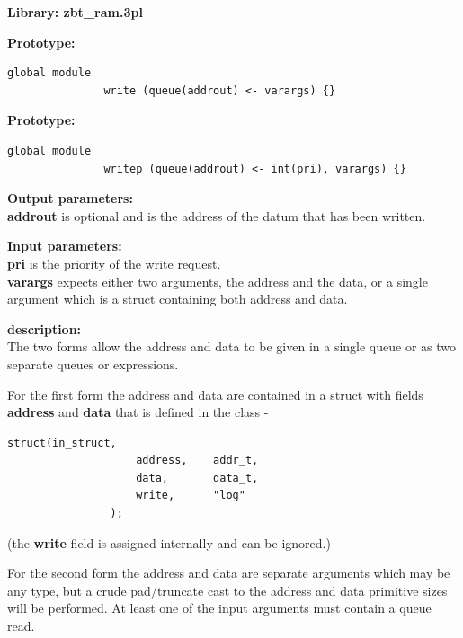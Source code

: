             {\bf Library: zbt\_ram.3pl}

            {\bf Prototype:} \\
            \vsp
            \begin{lstlisting}[gobble=12, language=threepl]
               global module
               write (queue(addrout) <- varargs) {}
            \end{lstlisting}
            {\bf Prototype:} \\
            \vsp
            \begin{lstlisting}[gobble=12, language=threepl]
               global module
               writep (queue(addrout) <- int(pri), varargs) {}
            \end{lstlisting}

            {\bf Output parameters:} \\
            {\bf addrout} is optional and is the address of the datum that
            has been written.

            {\bf Input parameters:} \\
            {\bf pri} is the priority of the write request. \\
            {\bf varargs} expects either two arguments, the address and the data,
            or a single argument which is a struct containing both address and
            data.

            {\bf description:} \\
            The two forms allow the address and data to be given in a single
            queue or as two separate queues or expressions.
            
            For the first form the address and data are contained in a
            struct with fields {\bf address} and {\bf data} that is defined in
            the class -            
            \begin{lstlisting}[gobble=12, language=threepl]
                struct(in_struct,
                    address,    addr_t,
                    data,       data_t,
                    write,      "log"
                );
            \end{lstlisting}
            (the {\bf write} field is assigned internally and can be ignored.)

            
            For the second form the address and data are separate arguments
            which may be any type, but a crude pad/truncate cast to the
            address and data primitive sizes will be performed. At least one of
            the input arguments must contain a queue read.
            
